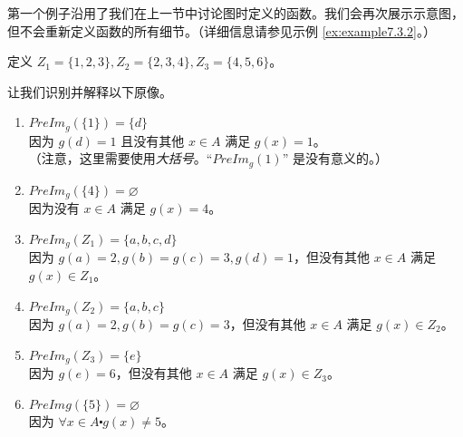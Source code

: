 \begin{example}
    第一个例子沿用了我们在上一节中讨论图时定义的函数。我们会再次展示示意图，但不会重新定义函数的所有细节。（详细信息请参见示例 \ref{ex:example7.3.2}。）

    \begin{center}
        {}
    \end{center}

    定义 $Z_1 = \{1, 2, 3\}, Z_2 = \{2, 3, 4\}, Z_3 = \{4, 5, 6\}$。

    让我们识别并解释以下原像。

    \begin{enumerate}[label=(\arabic*)]
        \item $PreIm_g(\{1\}) = \{d\}$ \\
            因为 $g(d) = 1$ 且没有其他 $x \in A$ 满足 $g(x) = 1$。\\
            （注意，这里需要使用\emph{大括号}。``$PreIm_g(1)$'' 是没有意义的。）
        \item $PreIm_g(\{4\}) = \varnothing$ \\
            因为没有 $x \in A$ 满足 $g(x) = 4$。
        \item $PreIm_g(Z_1) = \{a, b, c, d\}$ \\
            因为 $g(a) = 2, g(b) = g(c) = 3, g(d) = 1$，但没有其他 $x \in A$ 满足 $g(x) \in Z_1$。
        \item $PreIm_g(Z_2) = \{a, b, c\}$ \\
            因为 $g(a) = 2, g(b) = g(c) = 3$，但没有其他 $x \in A$ 满足 $g(x) \in Z_2$。
        \item $PreIm_g(Z_3) = \{e\}$ \\
            因为 $g(e) = 6$，但没有其他 $x \in A$ 满足 $g(x) \in Z_3$。
        \item $PreImg(\{5\}) = \varnothing$ \\
            因为 $\forall x \in A \centerdot g(x) \ne 5$。
    \end{enumerate}
\end{example}

